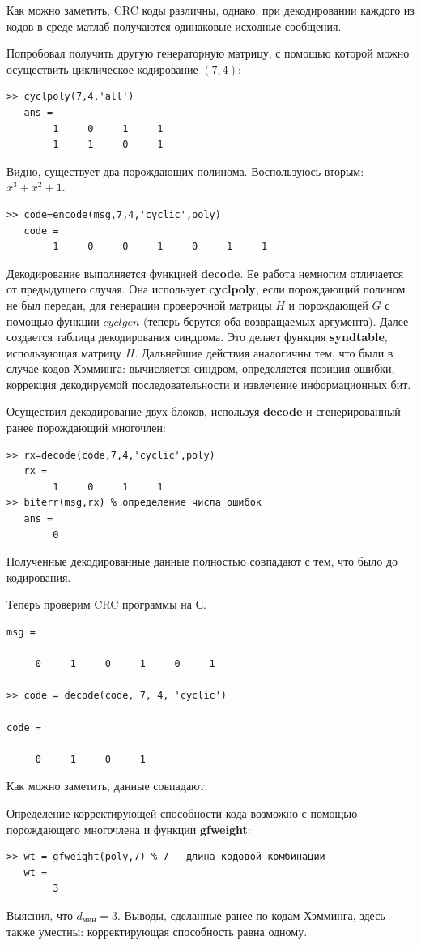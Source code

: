 \documentclass[12pt,a4paper]{article}
\begin{document}
Как можно заметить, CRC коды различны, однако, при декодировании каждого из кодов в среде матлаб получаются одинаковые исходные сообщения.

  Попробовал получить другую генераторную матрицу, с помощью которой можно осуществить циклическое кодирование $(7,4)$:
  \begin{lstlisting}
>> cyclpoly(7,4,'all')
   ans =
        1     0     1     1
        1     1     0     1
  \end{lstlisting}
  Видно, существует два порождающих полинома. Воспользуюсь вторым: $x^3+x^2+1$.
  \begin{lstlisting}
>> code=encode(msg,7,4,'cyclic',poly)
   code =
        1     0     0     1     0     1     1
  \end{lstlisting}
  
  Декодирование выполняется функцией \textbf{decode}. Ее работа немногим отличается от предыдущего случая. Она использует \textbf{cyclpoly}, если порождающий полином не был передан, для генерации проверочной матрицы $H$ и порождающей $G$ с помощью функции $cyclgen$ (теперь берутся оба возвращаемых аргумента). Далее создается таблица декодирования синдрома. Это делает функция \textbf{syndtable}, использующая матрицу $H$. Дальнейшие действия аналогичны тем, что были в случае кодов Хэмминга: вычисляется синдром, определяется позиция ошибки, коррекция декодируемой последовательности и извлечение информационных бит.
  
  Осуществил декодирование двух блоков, используя \textbf{decode} и сгенерированный ранее порождающий многочлен:
  \begin{lstlisting}
>> rx=decode(code,7,4,'cyclic',poly)
   rx =
        1     0     1     1
>> biterr(msg,rx) % определение числа ошибок
   ans =
        0
  \end{lstlisting}
  Полученные декодированные данные полностью совпадают с тем, что было до кодирования.
  
Теперь проверим CRC программы на С.
\begin{lstlisting}
msg =

     0     1     0     1     0     1

>> code = decode(code, 7, 4, 'cyclic')

code =

     0     1     0     1
  \end{lstlisting}
Как можно заметить, данные совпадают.

   Определение корректирующей способности кода возможно с помощью порождающего многочлена и функции \textbf{gfweight}:
  \begin{lstlisting}
>> wt = gfweight(poly,7) % 7 - длина кодовой комбинации
   wt =
        3
  \end{lstlisting}
  Выяснил, что $d_\textbf{мин}=3$. Выводы, сделанные ранее по кодам Хэмминга, здесь также уместны: корректирующая способность равна одному.
  
\end{document}
